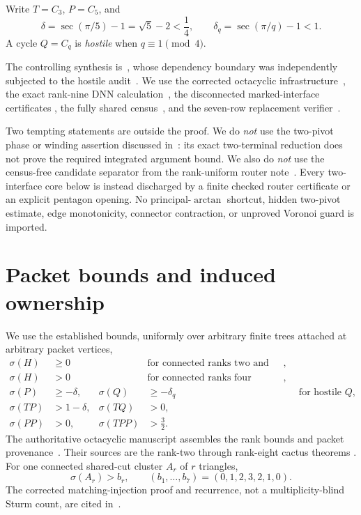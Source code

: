 \documentclass[11pt]{article}
\newcommand{\sig}{\sigma}
\begin{document}
Write $T=C_3$, $P=C_5$, and
\[
 \delta=\sec(\pi/5)-1=\sqrt5-2<\frac14,
 \qquad \delta_q=\sec(\pi/q)-1<1.
\]
A cycle $Q=C_q$ is \emph{hostile} when $q\equiv1\pmod4$.

The controlling synthesis is~\cite{Synthesis}, whose dependency boundary was
independently subjected to the hostile audit~\cite{HostileAudit}.  We use the
corrected octacyclic infrastructure~\cite{Octacyclic}, the exact rank-nine DNN
calculation~\cite{DNNResidual}, the disconnected marked-interface certificates
\cite{Disconnected,TwoInterface}, the fully shared census~\cite{SharedCensus},
and the seven-row replacement verifier~\cite{Seven}.

Two tempting statements are outside the proof.  We do \emph{not} use the
two-pivot phase or winding assertion discussed in~\cite{TwoPivot}: its exact
two-terminal reduction does not prove the required integrated argument bound.
We also do \emph{not} use the census-free candidate separator from the
rank-uniform router note~\cite{CandidateSeparator}.  Every two-interface core
below is instead discharged by a finite checked router certificate or an
explicit pentagon opening.  No principal-$\arctan$ shortcut, hidden two-pivot
estimate, edge monotonicity, connector contraction, or unproved Voronoi guard
is imported.

\section{Packet bounds and induced ownership}

We use the established bounds, uniformly over arbitrary finite trees attached
at arbitrary packet vertices,
\begin{align}
 \sig(H)&\geq0 &&\text{for connected ranks two and three},\label{eq:low0}\\
 \sig(H)&>0 &&\text{for connected ranks four through eight},\label{eq:lowpos}\\
 \sig(P)&\geq-\delta,& \sig(Q)&\geq-\delta_q
   &&\text{for hostile $Q$},\label{eq:hostile}\\
 \sig(TP)&>1-\delta,& \sig(TQ)&>0,\label{eq:mixed}\\
 \sig(PP)&>0,& \sig(TPP)&>\frac32.\label{eq:pp}
\end{align}
The authoritative octacyclic manuscript assembles the rank bounds and packet
provenance~\cite[Section~2]{Octacyclic}.  Their sources are the rank-two through
rank-eight cactus theorems
\cite{Bicyclic,Tricyclic,Tetracyclic,Pentacyclic,Hexacyclic,Heptacyclic,Octacyclic}.
For one connected shared-cut cluster $A_r$ of $r$ triangles,
\begin{equation}\label{eq:triangle}
 \sig(A_r)>b_r,
 \qquad (b_1,\ldots,b_7)=(0,1,2,3,2,1,0).
\end{equation}
The corrected matching-injection proof and recurrence, not a
multiplicity-blind Sturm count, are cited in~\cite[Section~2]{Octacyclic}.
\end{document}
